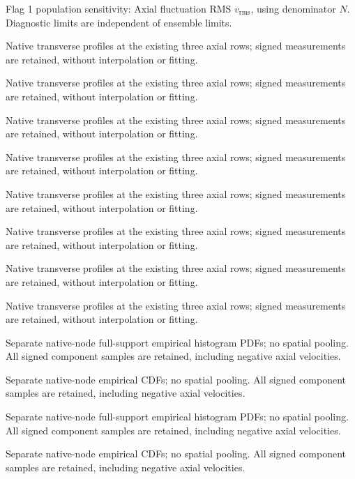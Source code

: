 \caption{Flag 1 population sensitivity: Axial fluctuation RMS $v_{\mathrm{rms}}$, using denominator $N$. Diagnostic limits are independent of ensemble limits.}

\caption{Native transverse profiles at the existing three axial rows; signed measurements are retained, without interpolation or fitting.}

\caption{Native transverse profiles at the existing three axial rows; signed measurements are retained, without interpolation or fitting.}

\caption{Native transverse profiles at the existing three axial rows; signed measurements are retained, without interpolation or fitting.}

\caption{Native transverse profiles at the existing three axial rows; signed measurements are retained, without interpolation or fitting.}

\caption{Native transverse profiles at the existing three axial rows; signed measurements are retained, without interpolation or fitting.}

\caption{Native transverse profiles at the existing three axial rows; signed measurements are retained, without interpolation or fitting.}

\caption{Native transverse profiles at the existing three axial rows; signed measurements are retained, without interpolation or fitting.}

\caption{Native transverse profiles at the existing three axial rows; signed measurements are retained, without interpolation or fitting.}

\caption{Separate native-node full-support empirical histogram PDFs; no spatial pooling. All signed component samples are retained, including negative axial velocities.}

\caption{Separate native-node empirical CDFs; no spatial pooling. All signed component samples are retained, including negative axial velocities.}

\caption{Separate native-node full-support empirical histogram PDFs; no spatial pooling. All signed component samples are retained, including negative axial velocities.}

\caption{Separate native-node empirical CDFs; no spatial pooling. All signed component samples are retained, including negative axial velocities.}

